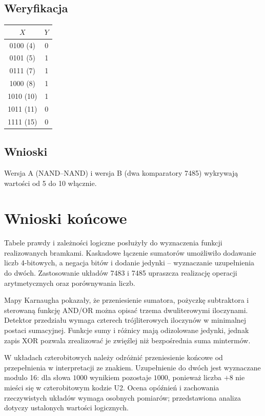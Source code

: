 \documentclass[12pt,a4paper]{article}
\begin{document}
\subsection{Weryfikacja}
\begin{center}
\begin{tabular}{c|c}
\toprule
$X$&$Y$\\
\midrule
0100 (4)&0\\
0101 (5)&1\\
0111 (7)&1\\
1000 (8)&1\\
1010 (10)&1\\
1011 (11)&0\\
1111 (15)&0\\
\bottomrule
\end{tabular}
\end{center}
\subsection{Wnioski}
Wersja A (NAND--NAND) i wersja B (dwa komparatory 7485) wykrywają wartości od 5 do 10 włącznie.
\section{Wnioski końcowe}
Tabele prawdy i zależności logiczne posłużyły do wyznaczenia funkcji realizowanych bramkami. Kaskadowe łączenie sumatorów umożliwiło dodawanie liczb 4-bitowych, a negacja bitów i dodanie jedynki -- wyznaczanie uzupełnienia do dwóch. Zastosowanie układów 7483 i 7485 upraszcza realizację operacji arytmetycznych oraz porównywania liczb.


Mapy Karnaugha pokazały, że przeniesienie sumatora, pożyczkę subtraktora
i sterowaną funkcję AND/OR można opisać trzema dwuliterowymi iloczynami.
Detektor przedziału wymaga czterech trójliterowych iloczynów w minimalnej
postaci sumacyjnej. Funkcje sumy i różnicy mają odizolowane jedynki,
jednak zapis XOR pozwala zrealizować je zwięźlej niż bezpośrednia suma mintermów.

W układach czterobitowych należy odróżnić przeniesienie końcowe od
przepełnienia w interpretacji ze znakiem. Uzupełnienie do dwóch jest
wyznaczane modulo 16: dla słowa $1000$ wynikiem pozostaje $1000$,
ponieważ liczba $+8$ nie mieści się w czterobitowym kodzie U2.
Ocena opóźnień i zachowania rzeczywistych układów wymaga osobnych pomiarów;
przedstawiona analiza dotyczy ustalonych wartości logicznych.
\end{document}
